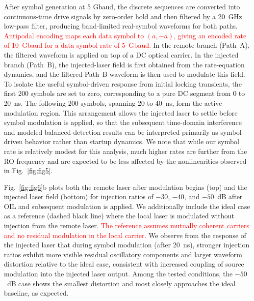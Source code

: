 \documentclass[%
 aip,
 apl,
 amsmath,amssymb,
 reprint,%
 floatfix,
]{revtex4-1}
\begin{document}
After symbol generation at 5 Gbaud, the discrete sequences are converted into continuous-time drive signals by zero-order hold and then filtered by a 20~GHz low-pass filter, producing band-limited real-symbol waveforms for both paths.
\textcolor{red}{Antipodal encoding maps each data symbol to $(a,-a)$, giving an encoded rate of 10~Gbaud for a data-symbol rate of 5~Gbaud.} In the remote branch (Path~A), the filtered waveform is applied on top of a DC optical carrier. In the injected branch (Path~B), the injected-laser field is first obtained from the rate-equation dynamics, and the filtered Path~B waveform is then used to modulate this field. To isolate the useful symbol-driven response from initial locking transients, the first 200 symbols are set to zero, corresponding to a pure DC segment from 0 to 20~ns. The following 200 symbols, spanning 20 to 40~ns, form the active modulation region. This arrangement allows the injected laser to settle before symbol modulation is applied, so that the subsequent time-domain interference and modeled balanced-detection results can be interpreted primarily as symbol-driven behavior rather than startup dynamics. We note that while our symbol rate is relatively modest for this analysis, much higher rates are further from the RO frequency and are expected to be less affected by the nonlinearities observed in Fig.~\ref{fig:fig5}.

Fig.~\ref{fig:fig6}b plots both the remote laser after modulation begins (top) and the injected laser field (bottom) for injection ratios of $-30$, $-40$, and $-50$~dB after OIL and subsequent modulation is applied. We additionally include the ideal case as a reference (dashed black line) where the local laser is modulated without injection from the remote laser.
\textcolor{red}{The reference assumes mutually coherent carriers and no residual modulation in the local carrier.} We observe from the response of the injected laser that during symbol modulation (after 20~ns), stronger injection ratios exhibit more visible residual oscillatory components and larger waveform distortion relative to the ideal case, consistent with increased coupling of source modulation into the injected laser output.
Among the tested conditions, the $-50$~dB case shows the smallest distortion and most closely approaches the ideal baseline, as expected.
\end{document}
